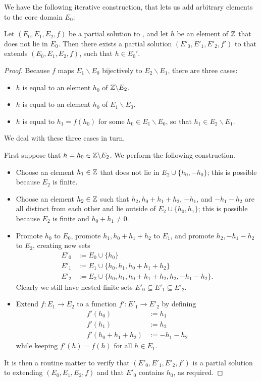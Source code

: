 We have the following iterative construction, that lets us add arbitrary elements to the core domain $E_0$:

\begin{lemma}\label{iteration} Let $(E_0, E_1, E_2, f)$ be a partial solution to , and let $h$ be an element of $\mathbb{Z}$ that does not lie in $E_0$.  Then there exists a partial solution $(E'_0, E'_1, E'_2, f')$ to  that extends $(E_0, E_1, E_2, f)$, such that $h \in E_0'$.
\end{lemma}

\begin{proof}  Because $f$ maps $E_1 \backslash E_0$ bijectively to $E_2 \backslash E_1$, there are three cases:
\begin{itemize}
  \item $h$ is equal to an element $h_0$ of $\mathbb{Z} \backslash E_2$.
  \item $h$ is equal to an element $h_0$ of $E_1 \backslash E_0$.
  \item $h$ is equal to $h_1 = f(h_0)$ for some $h_0 \in E_1 \backslash E_0$, so that $h_1 \in E_2 \backslash E_1$.
\end{itemize}

We deal with these three cases in turn.

First suppose that $h = h_0\in \mathbb{Z} \backslash E_2$.  We perform the following construction.

\begin{itemize}
  \item Choose an element $h_1 \in \mathbb{Z}$ that does not lie in $E_2 \cup \{h_0, -h_0\}$; this is possible because $E_2$ is finite.
  \item Choose an element $h_2 \in \mathbb{Z}$ such that $h_2, h_0+h_1+h_2$, $-h_1$, and $-h_1-h_2$ are all distinct from each other and lie outside of $E_2 \cup \{h_0, h_1\}$; this is possible because $E_2$ is finite and $h_0+h_1 \neq 0$.
  \item Promote $h_0$ to $E_0$, promote $h_1, h_0+h_1+h_2$ to $E_1$, and promote $h_2, -h_1-h_2$ to $E_2$, creating new sets
  \begin{align*}
    E'_0 &:= E_0 \cup \{h_0\} \\
    E'_1 &:= E_1 \cup \{h_0, h_1, h_0+h_1+h_2\} \\
    E'_2 &:= E_2 \cup \{h_0, h_1, h_0+h_1+h_2, h_2, -h_1-h_2\}.
  \end{align*}
  Clearly we still have nested finite sets $E'_0 \subseteq E'_1 \subseteq E'_2$.
  \item Extend $f : E_1 \to E_2$ to a function $f': E'_1 \to E'_2$ by defining
  \begin{align*}
    f'(h_0) &:= h_1 \\
    f'(h_1) &:= h_2 \\
    f'(h_0+h_1+h_2) &:= -h_1-h_2
  \end{align*}
  while keeping $f'(h)=f(h)$ for all $h \in E_1$.
\end{itemize}
It is then a routine matter to verify that $(E'_0,E'_1,E'_2,f')$ is a partial solution to  extending $(E_0,E_1,E_2,f)$ and that $E'_0$ contains $h_0$, as required.


\end{proof}
